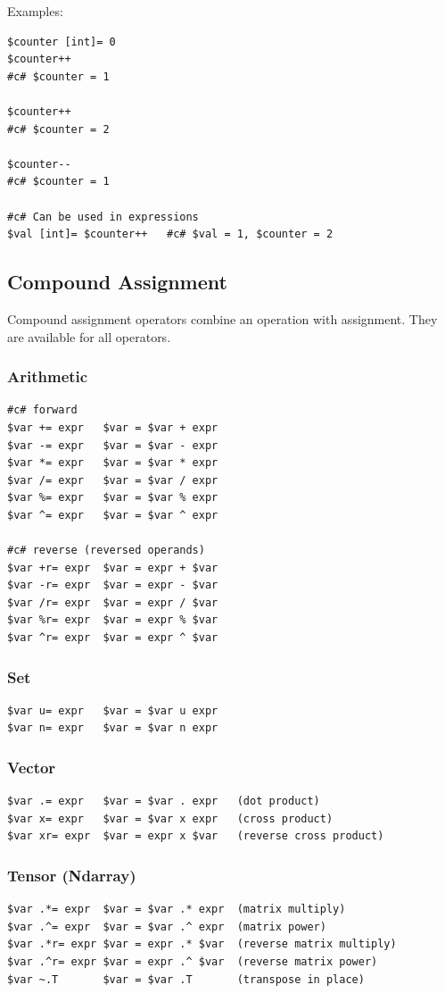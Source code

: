 \documentclass{report}
\begin{document}
Examples:
\begin{verbatim}
$counter [int]= 0
$counter++
#c# $counter = 1

$counter++
#c# $counter = 2

$counter--
#c# $counter = 1

#c# Can be used in expressions
$val [int]= $counter++   #c# $val = 1, $counter = 2
\end{verbatim}

\subsection{Compound Assignment}
Compound assignment operators combine an operation with assignment. They are available for all operators.

\subsubsection{Arithmetic}
\begin{verbatim}
#c# forward
$var += expr   $var = $var + expr
$var -= expr   $var = $var - expr
$var *= expr   $var = $var * expr
$var /= expr   $var = $var / expr
$var %= expr   $var = $var % expr
$var ^= expr   $var = $var ^ expr

#c# reverse (reversed operands)
$var +r= expr  $var = expr + $var
$var -r= expr  $var = expr - $var
$var /r= expr  $var = expr / $var
$var %r= expr  $var = expr % $var
$var ^r= expr  $var = expr ^ $var
\end{verbatim}

\subsubsection{Set}
\begin{verbatim}
$var u= expr   $var = $var u expr
$var n= expr   $var = $var n expr
\end{verbatim}

\subsubsection{Vector}
\begin{verbatim}
$var .= expr   $var = $var . expr   (dot product)
$var x= expr   $var = $var x expr   (cross product)
$var xr= expr  $var = expr x $var   (reverse cross product)
\end{verbatim}

\subsubsection{Tensor (Ndarray)}
\begin{verbatim}
$var .*= expr  $var = $var .* expr  (matrix multiply)
$var .^= expr  $var = $var .^ expr  (matrix power)
$var .*r= expr $var = expr .* $var  (reverse matrix multiply)
$var .^r= expr $var = expr .^ $var  (reverse matrix power)
$var ~.T       $var = $var .T       (transpose in place)
\end{verbatim}
\end{document}
